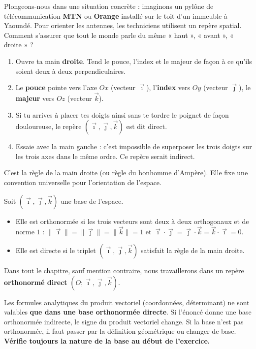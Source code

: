 \documentclass[11pt]{article}
\newcommand{\cle}[1]{{\popxbold\color{popdark}#1}}
\begin{document}
\begin{experience}
Plongeons-nous dans une situation concrète : imaginons un pylône de télécommunication \textbf{MTN} ou \textbf{Orange} installé sur le toit d'un immeuble à Yaoundé. Pour orienter les antennes, les techniciens utilisent un repère spatial. Comment s'assurer que tout le monde parle du même « haut », « avant », « droite » ?
\begin{enumerate}
  \item Ouvre ta main \textbf{droite}. Tend le pouce, l'index et le majeur de façon à ce qu'ils soient deux à deux perpendiculaires.
  \item Le \textbf{pouce} pointe vers l'axe $Ox$ (vecteur $\vec{\imath}$), l'\textbf{index} vers $Oy$ (vecteur $\vec{\jmath}$), le \textbf{majeur} vers $Oz$ (vecteur $\vec{k}$).
  \item Si tu arrives à placer tes doigts ainsi sans te tordre le poignet de façon douloureuse, le repère $(\vec{\imath},\vec{\jmath},\vec{k})$ est dit \cle{direct}.
  \item Essaie avec la main gauche : c'est impossible de superposer les trois doigts sur les trois axes dans le même ordre. Ce repère serait \cle{indirect}.
\end{enumerate}
C'est la \cle{règle de la main droite} (ou règle du bonhomme d'Ampère). Elle fixe une convention universelle pour l'orientation de l'espace.
\end{experience}

\begin{definition}
Soit $(\vec{\imath},\vec{\jmath},\vec{k})$ une base de l'espace.
\begin{itemize}
  \item Elle est \cle{orthonormée} si les trois vecteurs sont deux à deux orthogonaux et de norme $1$ : $\|\vec{\imath}\|=\|\vec{\jmath}\|=\|\vec{k}\|=1$ et $\vec{\imath}\cdot\vec{\jmath}=\vec{\jmath}\cdot\vec{k}=\vec{k}\cdot\vec{\imath}=0$.
  \item Elle est \cle{directe} si le triplet $(\vec{\imath},\vec{\jmath},\vec{k})$ satisfait la règle de la main droite.
\end{itemize}
Dans tout le chapitre, sauf mention contraire, nous travaillerons dans un repère \textbf{orthonormé direct} $(O;\vec{\imath},\vec{\jmath},\vec{k})$.
\end{definition}

\begin{attention}
Les formules analytiques du produit vectoriel (coordonnées, déterminant) ne sont valables \textbf{que dans une base orthonormée directe}. Si l'énoncé donne une base orthonormée indirecte, le signe du produit vectoriel change. Si la base n'est pas orthonormée, il faut passer par la définition géométrique ou changer de base. \textbf{Vérifie toujours la nature de la base au début de l'exercice.}
\end{attention}
\end{document}
